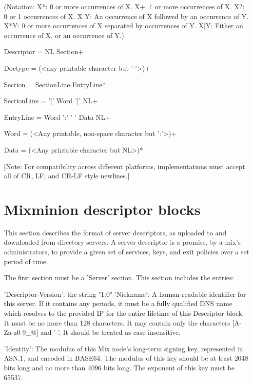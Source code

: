 (Notation:  X*: 0 or more occurrences of X.
            X+: 1 or more occurrences of X.
            X?: 0 or 1 occurrences of X.
            X Y: An occurrence of X followed by an occurrence of Y.
            X*{Y}: 0 or more occurrences of X separated by occurrences
                  of Y.
            X|Y: Either an occurrence of X, or an occurrence of Y.)

Descriptor = NL Section+ 

Doctype = (<any printable character but '-'>)+

Section = SectionLine EntryLine*

SectionLine = '[' Word ']' NL+

EntryLine = Word ':' ' ' Data NL+

Word = (<Any printable, non-space character but ':'>)+

Data = (<Any printable character but NL>)*

[Note: For compatibility across different platforms, implementations must
  accept all of CR, LF, and CR-LF style newlines.]

\section{Mixminion descriptor blocks}

This section describes the format of server descriptors, as uploaded
to and downloaded from directory servers.  A server descriptor is a
promise, by a mix's administrators, to provide a given set of
services, keys, and exit policies over a set period of time.

The first section must be a 'Server' section.  This section includes
the entries:

     'Descriptor-Version':  the string "1.0"
     'Nickname': A human-readable identifier for this server.  If it
         contains any periods, it must be a fully qualified DNS name
         which resolves to the provided IP for the entire lifetime of
         this Descriptor block.  It must be no more than 128
         characters.  It may contain only the characters 
         [A-Za-z0-9_@] and '-'.  It should be treated as
         case-insensitive.

     'Identity': The modulus of this Mix node's long-term signing key,
         represented in ASN.1, and encoded in BASE64.  The modulus of
         this key should be at least 2048 bits long and no more than
         4096 bits long.  The exponent of this key must be 65537.

